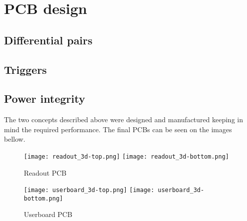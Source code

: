 \newpage
\chapter{PCB design}
\section{Differential pairs}
\section{Triggers}
\section{Power integrity}

The two concepts described above were designed and manufactured keeping in mind the required performance. The final PCBs can be seen on the images bellow. 
\newpage
\FloatBarrier
\begin{figure}[htp!]
    \centering
    \texttt{[image: readout\_3d-top.png]}
    \texttt{[image: readout\_3d-bottom.png]}
    \caption{Readout PCB}
    \label{fig:readout_3d}
\end{figure}
\FloatBarrier

\FloatBarrier
\begin{figure}[htp!]
    \centering
    \texttt{[image: userboard\_3d-top.png]}
    \hspace{1.8cm}
    \texttt{[image: userboard\_3d-bottom.png]}
    \caption{Userboard PCB}
    \label{fig:userboard_3d}
\end{figure}
\FloatBarrier
